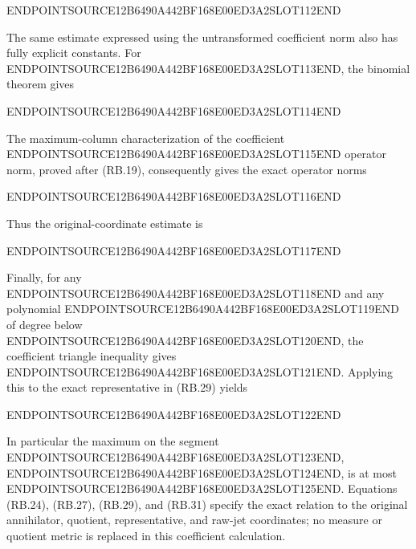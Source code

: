 ENDPOINTSOURCE12B6490A442BF168E00ED3A2SLOT112END

The same estimate expressed using the untransformed coefficient norm also has fully explicit constants. For ENDPOINTSOURCE12B6490A442BF168E00ED3A2SLOT113END, the binomial theorem gives

ENDPOINTSOURCE12B6490A442BF168E00ED3A2SLOT114END

The maximum-column characterization of the coefficient ENDPOINTSOURCE12B6490A442BF168E00ED3A2SLOT115END operator norm, proved after (RB.19), consequently gives the exact operator norms

ENDPOINTSOURCE12B6490A442BF168E00ED3A2SLOT116END

Thus the original-coordinate estimate is

ENDPOINTSOURCE12B6490A442BF168E00ED3A2SLOT117END

Finally, for any ENDPOINTSOURCE12B6490A442BF168E00ED3A2SLOT118END and any polynomial ENDPOINTSOURCE12B6490A442BF168E00ED3A2SLOT119END of degree below ENDPOINTSOURCE12B6490A442BF168E00ED3A2SLOT120END, the coefficient triangle inequality gives ENDPOINTSOURCE12B6490A442BF168E00ED3A2SLOT121END. Applying this to the exact representative in (RB.29) yields

ENDPOINTSOURCE12B6490A442BF168E00ED3A2SLOT122END

In particular the maximum on the segment ENDPOINTSOURCE12B6490A442BF168E00ED3A2SLOT123END, ENDPOINTSOURCE12B6490A442BF168E00ED3A2SLOT124END, is at most ENDPOINTSOURCE12B6490A442BF168E00ED3A2SLOT125END. Equations (RB.24), (RB.27), (RB.29), and (RB.31) specify the exact relation to the original annihilator, quotient, representative, and raw-jet coordinates; no measure or quotient metric is replaced in this coefficient calculation.
